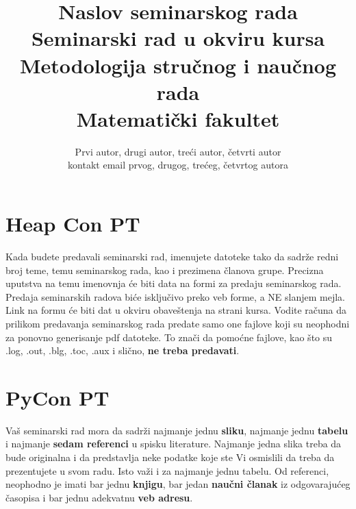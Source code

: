 \documentclass[a4paper]{article}
\begin{document}
\title{Naslov seminarskog rada\\ \small{Seminarski rad u okviru kursa\\Metodologija stručnog i naučnog rada\\ Matematički fakultet}}

\author{Prvi autor, drugi autor, treći autor, četvrti autor\\ kontakt email prvog, drugog, trećeg, četvrtog autora}


\maketitle


\tableofcontents

\newpage

\section{Heap Con PT}
\label{sec:uvod}

Kada budete predavali seminarski rad, imenujete datoteke tako da sadrže redni broj teme, temu seminarskog rada, kao i prezimena članova grupe. Precizna uputstva na temu imenovnja će biti data na formi za predaju seminarskog rada. Predaja seminarskih radova biće isključivo preko veb forme, a NE slanjem mejla. Link na formu će biti dat u okviru obaveštenja na strani kursa. Vodite računa da prilikom predavanja seminarskog rada predate samo one fajlove koji su neophodni za ponovno generisanje pdf datoteke. To znači da pomoćne fajlove, kao što su .log, .out, .blg, .toc, .aux i slično, \textbf{ne treba predavati}.

\section{PyCon PT}
Vaš seminarski rad mora da sadrži najmanje jednu \textbf{sliku}, najmanje jednu \textbf{tabelu} i najmanje \textbf{sedam referenci} u spisku literature. Najmanje jedna slika treba da bude originalna i da predstavlja neke podatke koje ste Vi osmislili da treba da prezentujete u svom radu. Isto važi i za najmanje jednu tabelu. 	Od referenci, neophodno je imati bar jednu \textbf{knjigu}, bar jedan \textbf{naučni članak} iz odgovarajućeg časopisa i bar jednu adekvatnu \textbf{veb adresu}. 
\end{document}

